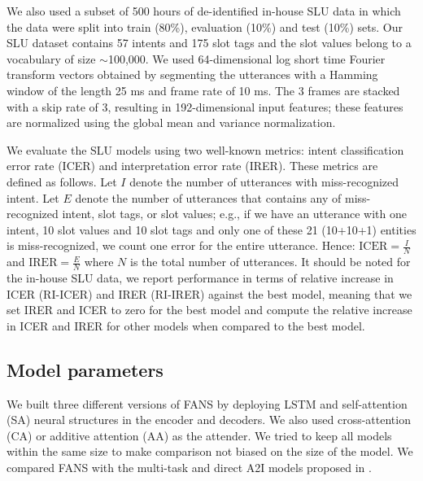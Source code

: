 \documentclass[a4paper]{article}
\begin{document}
 We also used a subset of  500 hours of de-identified in-house SLU data in which  the data were split into  train (80\%), evaluation (10\%) and test (10\%) sets. Our SLU dataset contains 57 intents and 175 slot tags and the slot values belong to a vocabulary of size $\sim$100,000. We used 64-dimensional log short time Fourier transform  vectors obtained by segmenting the utterances with a Hamming window of the length 25 ms and frame rate of 10 ms. The 3 frames are stacked with a skip rate of 3, resulting  in 192-dimensional input features; these features are normalized using the global mean and variance normalization.
 
We evaluate the SLU models using  two well-known metrics:  intent classification error rate (ICER)  and interpretation error rate (IRER). These metrics are defined as follows. Let $I$ denote the number of utterances with miss-recognized intent. Let $E$  denote the number of utterances  that contains  any of miss-recognized intent,  slot tags, or slot values; e.g., if we have an utterance with one intent, 10 slot values and 10 slot tags and only one of these 21 (10+10+1) entities is miss-recognized, we count one error for the entire utterance.  Hence: $\text{ICER} =\frac{I}{N} $ and $\text{IRER} =\frac{E}{N}$
where $N$ is the total number of utterances. It should be noted for the in-house SLU data, we report  performance in terms of  relative increase in ICER (RI-ICER) and IRER (RI-IRER) against the best model, meaning that we set IRER and ICER to zero for the best model and compute the relative increase in ICER and IRER for other models when compared  to the best model.

\subsection{Model parameters}
We built three different versions of FANS by deploying LSTM and self-attention (SA) \cite{vaswani2017attention} neural structures in the encoder and decoders. We also used  cross-attention  (CA)\cite{vaswani2017attention}  or  additive attention (AA) \cite{bahdanau2014neural} as the attender.  We tried to keep all models within the  same size to make comparison not biased on the size of the model.  We compared FANS with the multi-task and direct A2I models proposed in \cite{haghani2018audio} . 
\end{document}
